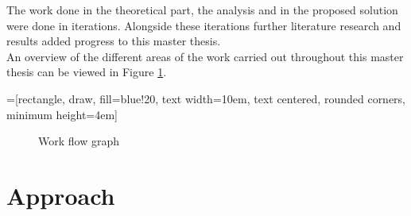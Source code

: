 \documentclass{cslthse-msc}
\begin{document}
The work done in the theoretical part, the analysis and in the proposed solution were done in iterations. Alongside these iterations further literature research and results added progress to this master thesis.\\
An overview of the different areas of the work carried out throughout this master thesis can be viewed in Figure \ref{workflowgrapgh}.

=[rectangle, draw, fill=blue!20, 
    text width=10em, text centered, rounded corners, minimum height=4em]
\begin{figure}[H]
\begin{center}
\end{center}
\caption {Work flow graph}
\label{workflowgrapgh}
\end{figure}         

\chapter{Approach}\label{sec:approach}
\end{document}
